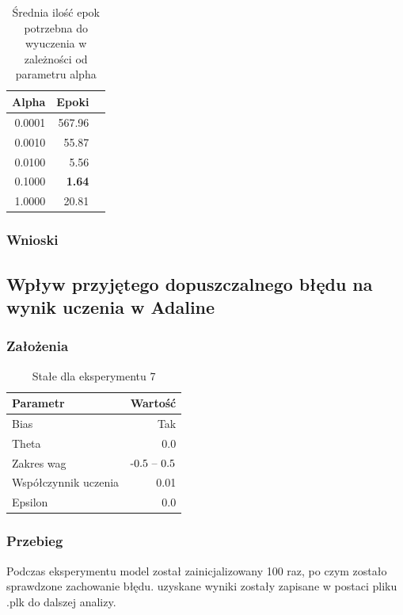 \documentclass{article}
\begin{document}
\begin{table}[!h]
	\caption{Średnia ilość epok potrzebna do wyuczenia w zależności od parametru alpha}
	\label{tabela-res-6}
	\centering
	\begin{tabular}{rrr}
		\toprule
		Alpha  & Epoki         \\
		\midrule
		0.0001 & 567.96        \\
		0.0010 & 55.87         \\
		0.0100 & 5.56          \\
		0.1000 & \textbf{1.64} \\
		1.0000 & 20.81         \\
		\bottomrule
	\end{tabular}
\end{table}

\subsubsection*{Wnioski}

\newpage
\subsection{Wpływ przyjętego dopuszczalnego błędu na wynik uczenia w Adaline}
\subsubsection*{Założenia}
\begin{table}[!h]
	\caption{Stałe dla eksperymentu 7}
	\label{tabela-const-7}
	\centering
	\begin{tabular}{lr}
		\toprule
		Parametr               & Wartość         \\
		\midrule
		Bias                   & Tak               \\
		Theta                  & 0.0               \\
		Zakres wag             & \($-0.5 -- 0.5$\) \\
		Współczynnik uczenia & 0.01              \\
		Epsilon                & 0.0               \\
		\bottomrule
	\end{tabular}
\end{table}
\subsubsection*{Przebieg}

Podczas eksperymentu model został zainicjalizowany 100 raz, po czym zostało sprawdzone zachowanie błędu. uzyskane wyniki zostały zapisane w postaci pliku .plk do dalszej analizy.
\end{document}
